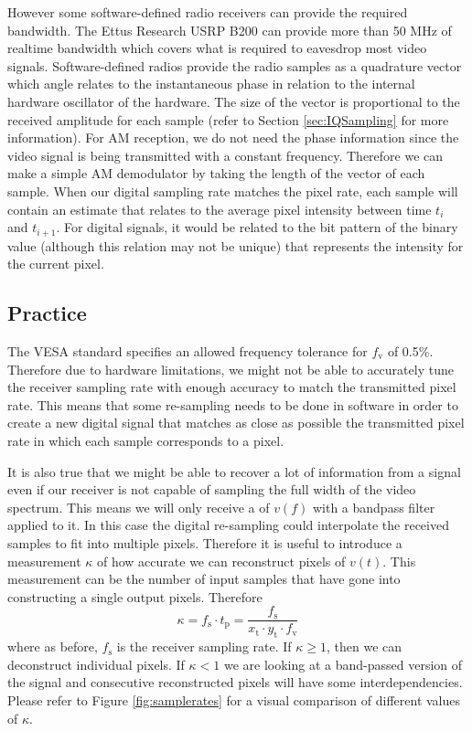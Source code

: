 \documentclass[a4paper,12pt,twoside,openright]{report}
\begin{document}
However some software-defined radio receivers can provide the required bandwidth. The Ettus Research USRP B200 can provide more than 50 MHz of realtime bandwidth which covers what is required to eavesdrop most video signals. Software-defined radios provide the radio samples as a quadrature vector which angle relates to the instantaneous phase in relation to the internal hardware oscillator of the hardware. The size of the vector is proportional to the received amplitude for each sample (refer to Section \ref{sec:IQSampling} for more information). For AM reception, we do not need the phase information since the video signal is being transmitted with a constant frequency. Therefore we can make a simple AM demodulator by taking the length of the vector of each sample. When our digital sampling rate matches the pixel rate, each sample will contain an estimate that relates to the average pixel intensity between time $t_{i}$ and $t_{i+1}$. For digital signals, it would be related to the bit pattern of the binary value (although this relation may not be unique) that represents the intensity for the current pixel.

\subsection{Practice}
The VESA standard specifies an allowed frequency tolerance for $f_\text{v}$ of 0.5\%. Therefore due to hardware limitations, we might not be able to accurately tune the receiver sampling rate with enough accuracy to match the transmitted pixel rate. This means that some re-sampling needs to be done in software in order to create a new digital signal that matches as close as possible the transmitted pixel rate in which each sample corresponds to a pixel.

It is also true that we might be able to recover a lot of information from a signal even if our receiver is not capable of sampling the full width of the video spectrum. This means we will only receive a of $v(f)$ with a bandpass filter applied to it. In this case the digital re-sampling could interpolate the received samples to fit into multiple pixels. Therefore it is useful to introduce a measurement $\kappa$ of how accurate we can reconstruct pixels of $v(t)$. This measurement can be the number of input samples that have gone into constructing a single output pixels. Therefore
\begin{equation}
\label{eq:kappa}
\kappa = f_\text{s} \cdot t_\text{p} = \frac{f_\text{s}}{x_\text{t} \cdot y_\text{t} \cdot f_\text{v}}
\end{equation}
where as before, $f_\text{s}$ is the receiver sampling rate. If $\kappa \geq 1$, then we can deconstruct individual pixels. If $\kappa < 1$ we are looking at a band-passed version of the signal and consecutive reconstructed pixels will have some interdependencies. Please refer to Figure \ref{fig:samplerates} for a visual comparison of different values of $\kappa$.
\end{document}
